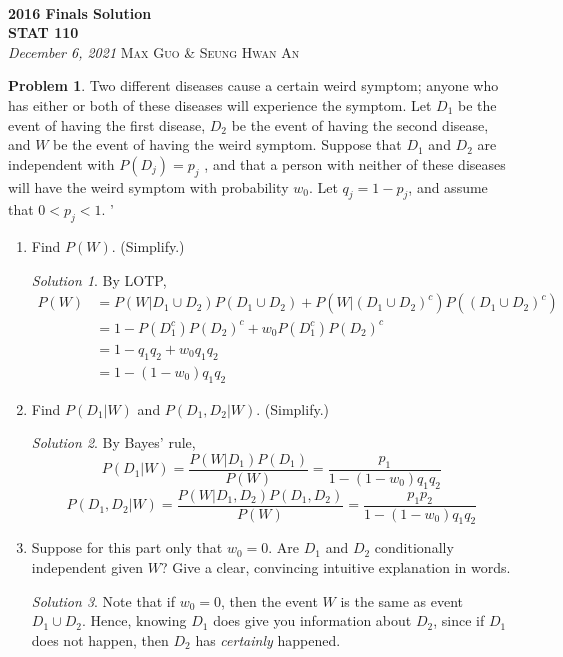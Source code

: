 \documentclass[11pt]{article}
\theoremstyle{definition}
\newtheorem{prob}[theo]{\color{Maroon} Problem}
\theoremstyle{remark}
\newtheorem*{soln}{\color{Maroon} Solution}
\newcommand{\inserttitle}{2016 Finals Solution}
\newcommand{\insertauthor}{Max Guo \& Seung Hwan An}
\newcommand{\insertcourse}{STAT 110}
\begin{document}
{\noindent\Huge\bf  \\[0.1\baselineskip] {\inserttitle }}\\[2\baselineskip]
{{\bf \insertcourse}\\ {\textit{December 6, 2021}}} \hfill {\large \textsc{\insertauthor}}
\smallskip

\begin{prob} Two different diseases cause a certain weird symptom; anyone who has either or both
of these diseases will experience the symptom. Let $D_1$ be the event of having the first
disease, $D_2$ be the event of having the second disease, and $W$ be the event of having the
weird symptom. Suppose that $D_1$ and $D_2$ are independent with $P(D_j) = p_j$ , and that a
person with neither of these diseases will have the weird symptom with probability $w_0$. Let
$q_j = 1 - p_j$, and assume that $0 < p_j < 1$.
'
\begin{enumerate}[label = (\alph*)]
    \item Find $P(W)$. (Simplify.)
    
    \begin{soln} By LOTP, \begin{align*}
        P(W) & = P(W|D_1 \cup D_2) P(D_1 \cup D_2) + P(W|(D_1 \cup D_2)^c) P((D_1 \cup D_2)^c) \\
        & = 1 - P(D_1^c) P(D_2)^c + w_0 P(D_1^c) P(D_2)^c \\
        & = 1 - q_1 q_2 + w_0 q_1 q_2 \\
        & = 1 - (1-w_0) q_1 q_2
    \end{align*}
    
    \end{soln}
    
    \dotfill
    
    \item Find $P(D_1|W)$ and $P(D_1,D_2 | W)$. (Simplify.)
    
    \begin{soln} By Bayes' rule, $$ P(D_1|W) = \frac{P(W|D_1) P(D_1)}{P(W)} = \frac{p_1}{1 - (1-w_0) q_1 q_2} $$ $$ P(D_1,D_2 | W) = \frac{P(W|D_1,D_2)P(D_1,D_2)}{P(W)} = \frac{p_1 p_2}{1 - (1-w_0) q_1 q_2} $$
    
    \end{soln}
    
    \dotfill
    
    \item Suppose for this part only that $w_0 = 0$. Are $D_1$ and $D_2$ conditionally independent given $W$? Give a clear, convincing intuitive explanation in words. 
    
    \begin{soln} Note that if $w_0=0$, then the event $W$ is the same as event $D_1 \cup D_2$. Hence, knowing $D_1$ does give you information about $D_2$, since if $D_1$ does not happen, then $D_2$ has \textit{certainly} happened.
    
    \end{soln}
    
\end{enumerate} 

\end{prob}
\end{document}
